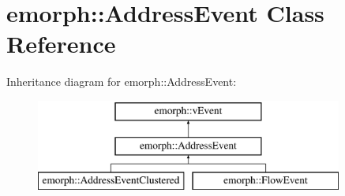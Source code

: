 \hypertarget{classemorph_1_1AddressEvent}{\section{emorph\-:\-:Address\-Event Class Reference}
\label{classemorph_1_1AddressEvent}
}
Inheritance diagram for emorph\-:\-:Address\-Event\-:\begin{figure}[H]
\begin{center}
\leavevmode
\includegraphics[height=3.000000cm]{classemorph_1_1AddressEvent}
\end{center}
\end{figure}
